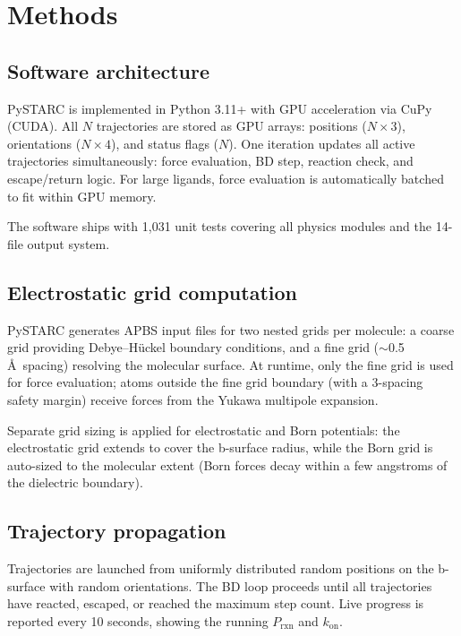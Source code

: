 \documentclass[journal=jctcce,manuscript=article,layout=twocolumn]{achemso}
\newcommand{\kon}{k_{\mathrm{on}}}
\newcommand{\Prxn}{P_{\mathrm{rxn}}}
\begin{document}
\section{Methods}
\label{sec:methods}

\subsection{Software architecture}

PySTARC is implemented in Python 3.11+ with GPU acceleration via
CuPy (CUDA).
All $N$ trajectories are stored as GPU arrays: positions
($N \times 3$), orientations ($N \times 4$), and status flags ($N$).
One iteration updates all active trajectories simultaneously:
force evaluation, BD step, reaction check, and escape/return logic.
For large ligands, force evaluation is automatically batched to
fit within GPU memory.

The software ships with 1{,}031 unit tests covering all physics
modules and the 14-file output system.

\subsection{Electrostatic grid computation}

PySTARC generates APBS input files for two nested grids per molecule:
a coarse grid providing Debye--H\"uckel boundary conditions, and a
fine grid ($\sim$0.5\,\AA\ spacing) resolving the molecular surface.
At runtime, only the fine grid is used for force evaluation; atoms
outside the fine grid boundary (with a 3-spacing safety margin)
receive forces from the Yukawa multipole expansion.

Separate grid sizing is applied for electrostatic and Born
potentials: the electrostatic grid extends to cover the b-surface
radius, while the Born grid is auto-sized to the molecular extent
(Born forces decay within a few angstroms of the dielectric boundary).

\subsection{Trajectory propagation}

Trajectories are launched from uniformly distributed random positions
on the b-surface with random orientations.
The BD loop proceeds until all trajectories have reacted, escaped,
or reached the maximum step count.
Live progress is reported every 10 seconds, showing the running
$\Prxn$ and $\kon$.
\end{document}
